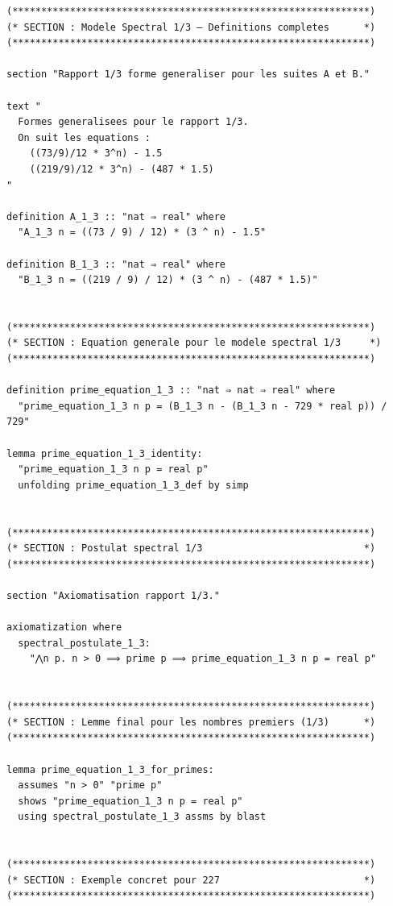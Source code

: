 \documentclass[a4paper,11pt]{article}
\begin{document}
\begin{holcode}[title={\textcolor{white}{Fichier : methode\_spectral.thy -- Partie 3/4}}]
\begin{lstlisting}
(**************************************************************)
(* SECTION : Modele Spectral 1/3 – Definitions completes      *)
(**************************************************************)

section "Rapport 1/3 forme generaliser pour les suites A et B."

text "
  Formes generalisees pour le rapport 1/3.
  On suit les equations :
    ((73/9)/12 * 3^n) - 1.5
    ((219/9)/12 * 3^n) - (487 * 1.5)
"

definition A_1_3 :: "nat ⇒ real" where
  "A_1_3 n = ((73 / 9) / 12) * (3 ^ n) - 1.5"

definition B_1_3 :: "nat ⇒ real" where
  "B_1_3 n = ((219 / 9) / 12) * (3 ^ n) - (487 * 1.5)"


(**************************************************************)
(* SECTION : Equation generale pour le modele spectral 1/3     *)
(**************************************************************)

definition prime_equation_1_3 :: "nat ⇒ nat ⇒ real" where
  "prime_equation_1_3 n p = (B_1_3 n - (B_1_3 n - 729 * real p)) / 729"

lemma prime_equation_1_3_identity:
  "prime_equation_1_3 n p = real p"
  unfolding prime_equation_1_3_def by simp


(**************************************************************)
(* SECTION : Postulat spectral 1/3                            *)
(**************************************************************)

section "Axiomatisation rapport 1/3."

axiomatization where
  spectral_postulate_1_3:
    "⋀n p. n > 0 ⟹ prime p ⟹ prime_equation_1_3 n p = real p"


(**************************************************************)
(* SECTION : Lemme final pour les nombres premiers (1/3)      *)
(**************************************************************)

lemma prime_equation_1_3_for_primes:
  assumes "n > 0" "prime p"
  shows "prime_equation_1_3 n p = real p"
  using spectral_postulate_1_3 assms by blast


(**************************************************************)
(* SECTION : Exemple concret pour 227                         *)
(**************************************************************)


\end{lstlisting}
\end{holcode}
\end{document}
